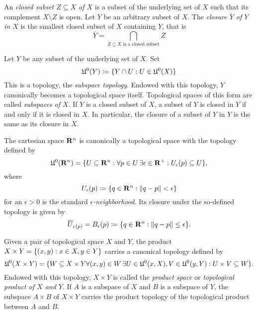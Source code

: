 An \emph{closed subset $Z \subseteq X$ of $X$} is a subset of the underlying
set of $X$ such that its complement $X \setminus Z$ is open. Let $Y$ be an
arbitrary subset of $X$. The \emph{closure $\overline Y$ of $Y$ in $X$} is the
smallest closed subset of $X$ containing $Y$, that is
\begin{equation}
  \overline Y = \bigcap_{\text{$Z \subseteq X$ is a closed subset}} Z
\end{equation}

Let $Y$ be any subset of the underlying set of $X$. Set
\[
  \mathfrak U^0(Y) \coloneqq \lbrace Y \cap U: U \in \mathfrak U^0(X)\rbrace
\]
This is a topology, the \emph{subspace topology}. Endowed with this topology,
$Y$ canonically becomes a topological space itself. Topological spaces of this form
are called \emph{subspaces of $X$}. If $Y$ is a closed subset of $X$, a subset of
$Y$ is closed in $Y$ if and only if it is closed in $X$. In particular, the closure
of a subset of $Y$ in $Y$ is the same as its closure in $X$.

The cartesian space $\mathbf{R}^n$ is canonically a topological space with the
topology defined by
\begin{equation}
  \label{eq:cartesian_topology}
  \mathfrak U^0(\mathbf{R}^n) = \lbrace U \subseteq \mathbf{R}^n : \forall p \in U \,
  \exists \epsilon \in \mathbf{R}^+: U_\epsilon(p) \subseteq U\rbrace,
\end{equation}
where
\[
  U_\epsilon(p) \coloneqq \lbrace q \in \mathbf{R}^n : \lVert q - p\rVert < \epsilon\rbrace
\]
for an $\epsilon > 0$ is the standard \emph{$\epsilon$-neighborhood}. Its 
closure under the so-defined topology is given by
\[
  \overline U_{\epsilon(p)} = B_\epsilon(p) \coloneqq
  \lbrace q \in \mathbf{R}^n : \lVert q - p\rVert \leq \epsilon\rbrace.
\]

Given a pair of topological space $X$ and $Y$, the product
$X \times Y = \lbrace(x, y) : x \in X, y \in Y\rbrace$ carries a canonical topology
defined by
\begin{equation}
  \label{eq:product_topology}
  \mathfrak U^0(X \times Y) = \lbrace W \subseteq X \times Y \forall (x, y) \in W \,
  \exists U \in \mathfrak U^0(x, X), V \in \mathfrak U^0(y, Y):
  U \times V \subseteq W\rbrace.
\end{equation}
Endowed with this topology, $X \times Y$ is called the \emph{product space} or
\emph{topological product of $X$ and $Y$}. If $A$ is a subspace of $X$ and
$B$ is a subspace of $Y$, the subspace $A \times B$ of $X \times Y$ carries the
product topology of the topological product between $A$ and $B$.

